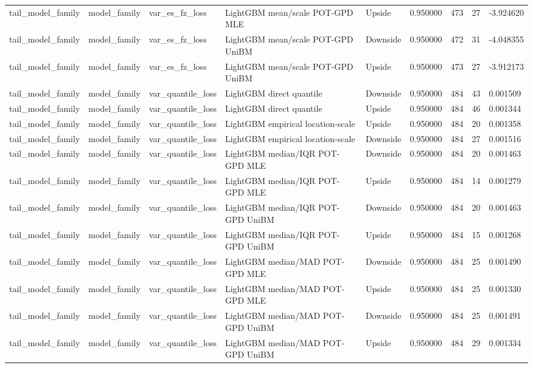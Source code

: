 \begin{tabular}{lllllrrr}
tail\_model\_family & model\_family & var\_es\_fz\_loss & LightGBM mean/scale POT-GPD MLE & Upside & 0.950000 & 473 & 27 & -3.924620 \\
tail\_model\_family & model\_family & var\_es\_fz\_loss & LightGBM mean/scale POT-GPD UniBM & Downside & 0.950000 & 472 & 31 & -4.048355 \\
tail\_model\_family & model\_family & var\_es\_fz\_loss & LightGBM mean/scale POT-GPD UniBM & Upside & 0.950000 & 473 & 27 & -3.912173 \\
tail\_model\_family & model\_family & var\_quantile\_loss & LightGBM direct quantile & Downside & 0.950000 & 484 & 43 & 0.001509 \\
tail\_model\_family & model\_family & var\_quantile\_loss & LightGBM direct quantile & Upside & 0.950000 & 484 & 46 & 0.001344 \\
tail\_model\_family & model\_family & var\_quantile\_loss & LightGBM empirical location-scale & Upside & 0.950000 & 484 & 20 & 0.001358 \\
tail\_model\_family & model\_family & var\_quantile\_loss & LightGBM empirical location-scale & Downside & 0.950000 & 484 & 27 & 0.001516 \\
tail\_model\_family & model\_family & var\_quantile\_loss & LightGBM median/IQR POT-GPD MLE & Downside & 0.950000 & 484 & 20 & 0.001463 \\
tail\_model\_family & model\_family & var\_quantile\_loss & LightGBM median/IQR POT-GPD MLE & Upside & 0.950000 & 484 & 14 & 0.001279 \\
tail\_model\_family & model\_family & var\_quantile\_loss & LightGBM median/IQR POT-GPD UniBM & Downside & 0.950000 & 484 & 20 & 0.001463 \\
tail\_model\_family & model\_family & var\_quantile\_loss & LightGBM median/IQR POT-GPD UniBM & Upside & 0.950000 & 484 & 15 & 0.001268 \\
tail\_model\_family & model\_family & var\_quantile\_loss & LightGBM median/MAD POT-GPD MLE & Downside & 0.950000 & 484 & 25 & 0.001490 \\
tail\_model\_family & model\_family & var\_quantile\_loss & LightGBM median/MAD POT-GPD MLE & Upside & 0.950000 & 484 & 25 & 0.001330 \\
tail\_model\_family & model\_family & var\_quantile\_loss & LightGBM median/MAD POT-GPD UniBM & Downside & 0.950000 & 484 & 25 & 0.001491 \\
tail\_model\_family & model\_family & var\_quantile\_loss & LightGBM median/MAD POT-GPD UniBM & Upside & 0.950000 & 484 & 29 & 0.001334 \\

\end{tabular}
